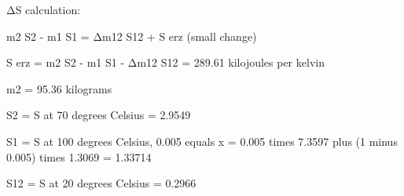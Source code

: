 ΔS calculation:  

m2 S2 - m1 S1 = Δm12 S12 + S erz (small change)  

S erz = m2 S2 - m1 S1 - Δm12 S12  
= 289.61 kilojoules per kelvin  

m2 = 95.36 kilograms  

S2 = S at 70 degrees Celsius = 2.9549  

S1 = S at 100 degrees Celsius, 0.005 equals x  
= 0.005 times 7.3597 plus (1 minus 0.005) times 1.3069  
= 1.33714  

S12 = S at 20 degrees Celsius = 0.2966